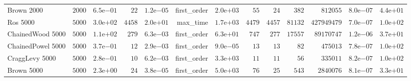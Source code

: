 \begin{longtable}[c]{lrrrrrrrrrrrr}
Brown 2000 & \( 2000\) & \( 6.5\)e\(-01\) & \(   22\) & \( 1.2\)e\(-05\) & first\_order & \( 2.0\)e\(+03\) & \(   55\) & \(   24\) & \(  382\) & \(812055\) & \( 8.0\)e\(-07\) & \( 4.4\)e\(+01\) \\
Ros 5000 & \( 5000\) & \( 3.0\)e\(+02\) & \( 4458\) & \( 2.0\)e\(+01\) & max\_time & \( 1.7\)e\(+03\) & \( 4479\) & \( 4457\) & \(81132\) & \(427949479\) & \( 7.0\)e\(-07\) & \( 1.0\)e\(+02\) \\
ChainedWood 5000 & \( 5000\) & \( 1.1\)e\(+02\) & \(  279\) & \( 6.3\)e\(-03\) & first\_order & \( 6.3\)e\(+01\) & \(  747\) & \(  277\) & \(17557\) & \(89170747\) & \( 1.2\)e\(-06\) & \( 3.7\)e\(+01\) \\
ChainedPowel 5000 & \( 5000\) & \( 3.7\)e\(-01\) & \(   12\) & \( 2.9\)e\(-03\) & first\_order & \( 9.0\)e\(-05\) & \(   13\) & \(   13\) & \(   82\) & \(475013\) & \( 7.8\)e\(-07\) & \( 1.0\)e\(+02\) \\
CraggLevy 5000 & \( 5000\) & \( 2.8\)e\(-01\) & \(   10\) & \( 6.2\)e\(-03\) & first\_order & \( 3.3\)e\(+03\) & \(   11\) & \(   11\) & \(   56\) & \(335011\) & \( 8.2\)e\(-07\) & \( 1.0\)e\(+02\) \\
Brown 5000 & \( 5000\) & \( 2.3\)e\(+00\) & \(   24\) & \( 3.8\)e\(-05\) & first\_order & \( 5.0\)e\(+03\) & \(   76\) & \(   25\) & \(  543\) & \(2840076\) & \( 8.1\)e\(-07\) & \( 3.3\)e\(+01\) \\
\hline 
\end{longtable}



